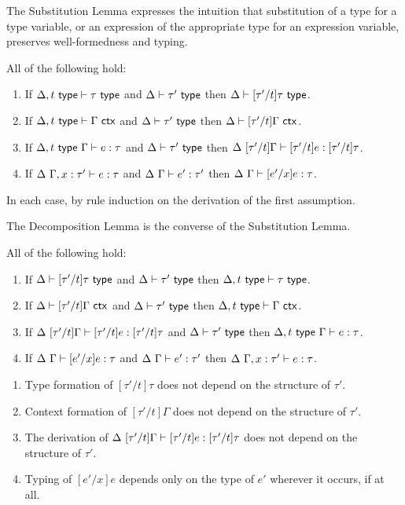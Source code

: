 The Substitution Lemma expresses the intuition that substitution of a type for a type variable, or an expression of the appropriate type for an expression variable, preserves well-formedness and typing. 
\begin{lemma}[Substitution]\label{lemma:substitution-U} All of the following hold:
\begin{enumerate}
\item If $\Delta, t~\mathsf{type} \vdash \tau~\mathsf{type}$ and $\Delta \vdash \tau'~\mathsf{type}$ then $\Delta \vdash [\tau'/t]\tau~\mathsf{type}$.
\item If $\Delta, t~\mathsf{type} \vdash \Gamma~\mathsf{ctx}$ and $\Delta \vdash \tau'~\mathsf{type}$ then $\Delta \vdash [\tau'/t]\Gamma~\mathsf{ctx}$.
\item If $\Delta, t~\mathsf{type}~\Gamma \vdash e : \tau$ and $\Delta \vdash \tau'~\mathsf{type}$ then $\Delta~[\tau'/t]\Gamma \vdash [\tau'/t]e : [\tau'/t]\tau$.
\item If $\Delta~\Gamma, x : \tau' \vdash e : \tau$ and $\Delta~\Gamma \vdash e' : \tau'$ then $\Delta~\Gamma \vdash [e'/x]e : \tau$.
\end{enumerate}\end{lemma}
\begin{proof-sketch}
In each case, by rule induction on the derivation of the first assumption.
\end{proof-sketch}
The Decomposition Lemma is the converse of the Substitution Lemma.
\begin{lemma}[Decomposition]\label{lemma:decomposition-U} All of the following hold:
\begin{enumerate}
\item If $\Delta \vdash [\tau'/t]\tau~\mathsf{type}$ and $\Delta \vdash \tau'~\mathsf{type}$ then $\Delta, t~\mathsf{type} \vdash \tau~\mathsf{type}$.
\item If $\Delta \vdash [\tau'/t]\Gamma~\mathsf{ctx}$ and $\Delta \vdash \tau'~\mathsf{type}$ then $\Delta, t~\mathsf{type} \vdash \Gamma~\mathsf{ctx}$.
\item If $\Delta~[\tau'/t]\Gamma \vdash [\tau'/t]e : [\tau'/t]\tau$ and $\Delta \vdash \tau'~\mathsf{type}$ then $\Delta, t~\mathsf{type}~\Gamma \vdash e : \tau$.
\item If $\Delta~\Gamma \vdash [e'/x]e : \tau$ and $\Delta~\Gamma \vdash e' : \tau'$ then $\Delta~\Gamma, x : \tau' \vdash e : \tau$.
\end{enumerate}\end{lemma}
\begin{proof-sketch}
\begin{enumerate}
\item Type formation of $[\tau'/t]\tau$ does not depend on the structure of $\tau'$.
\item Context formation of $[\tau'/t]\Gamma$ does not depend on the structure of $\tau'$.
\item The derivation of $\Delta~[\tau'/t]\Gamma \vdash [\tau'/t]e : [\tau'/t]\tau$ does not depend on the structure of $\tau'$.
\item Typing of $[e'/x]e$ depends only on the type of $e'$ wherever it occurs, if at all.
\end{enumerate}
\end{proof-sketch}

